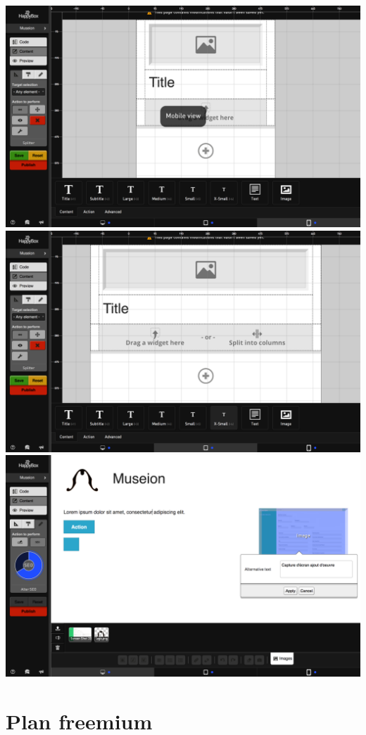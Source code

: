 \documentclass[11pt, a4paper ]{article}
\let\stdsection\section
\renewcommand\section{\newpage\stdsection}
\begin{document}
\begin{spacing}{1.5}
	\includegraphics[width=\textwidth]{images/HBscreen/10}
	\includegraphics[width=\textwidth]{images/HBscreen/11}
	\includegraphics[width=\textwidth]{images/HBscreen/12}

	\section{Plan freemium}


\end{spacing}
\end{document}
